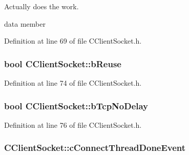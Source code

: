 \-Actually does the work. 

data member 

\-Definition at line 69 of file \-C\-Client\-Socket.\-h.

\hypertarget{class_c_client_socket_a637cd103e13587df34c0d1937e95aefa}{
\subsubsection[{b\-Reuse}]{\setlength{\rightskip}{0pt plus 5cm}bool {\bf \-C\-Client\-Socket\-::b\-Reuse}}}\label{class_c_client_socket_a637cd103e13587df34c0d1937e95aefa}


\-Definition at line 74 of file \-C\-Client\-Socket.\-h.

\hypertarget{class_c_client_socket_a0b7201c5883116b700d19bcfc61e49c5}{
\subsubsection[{b\-Tcp\-No\-Delay}]{\setlength{\rightskip}{0pt plus 5cm}bool {\bf \-C\-Client\-Socket\-::b\-Tcp\-No\-Delay}}}\label{class_c_client_socket_a0b7201c5883116b700d19bcfc61e49c5}


\-Definition at line 76 of file \-C\-Client\-Socket.\-h.

\hypertarget{class_c_client_socket_a9e119c8e8534aac4d7686469429e14b9}{
\subsubsection[{c\-Connect\-Thread\-Done\-Event}]{ {\bf \-C\-Client\-Socket\-::c\-Connect\-Thread\-Done\-Event}}}\label{class_c_client_socket_a9e119c8e8534aac4d7686469429e14b9}


